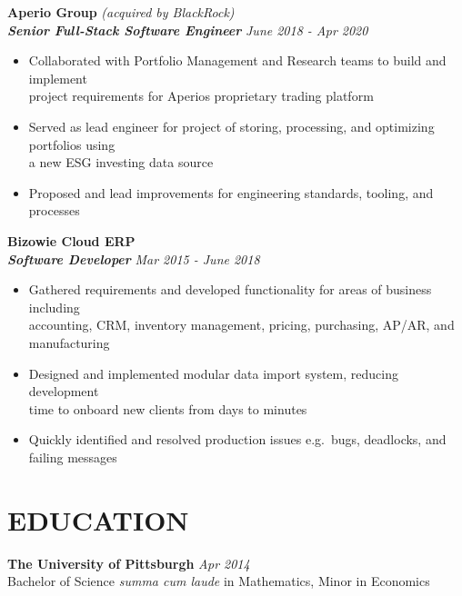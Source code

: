 \documentclass[]{resume}
\newcommand\tab[1][.5cm]{\hspace*{#1}}
\begin{document}
\begin{resume}

\vspace{0.9mm}
\textbf{\large Aperio Group} {\textit{\large(acquired by BlackRock)}}\\
\tab \textbf{\textit{Senior Full-Stack Software Engineer}} \hfill \textit{June 2018 - Apr 2020}
\begin{itemize}
    \item
    Collaborated with Portfolio Management and Research teams to build and implement \\
    project requirements for Aperio\textsc{}s proprietary trading platform
    \item
    Served as lead engineer for project of storing, processing, and optimizing portfolios using \\
    a new ESG investing data source
    \item
    Proposed and lead improvements for engineering standards, tooling, and processes
\end{itemize}


\textbf{\large Bizowie Cloud ERP}\\
\tab\textbf{\textit{Software Developer}} \hfill \textit{Mar 2015 - June 2018}
\begin{itemize}
    \item
    Gathered requirements and developed functionality for areas of business including \\
    accounting, CRM, inventory management, pricing, purchasing, AP/AR, and manufacturing
    \item
    Designed and implemented modular data import system, reducing development \\
    time to onboard new clients from days to minutes
    \item 
    Quickly identified and resolved production issues e.g.\ bugs, deadlocks, and failing messages
\end{itemize}


\section{EDUCATION\makebox[372 px]{\rule[.5 ex]{372 px}{1.0pt}}}
\vspace{0.9mm}
\textbf{\large The University of Pittsburgh} \hfill \textit{Apr 2014}\vspace{0.7mm}\\ 
\hspace*{4mm}Bachelor of Science \emph{summa cum laude} in Mathematics, Minor in Economics\\ %
\clearpage
\end{resume}
\end{document}
